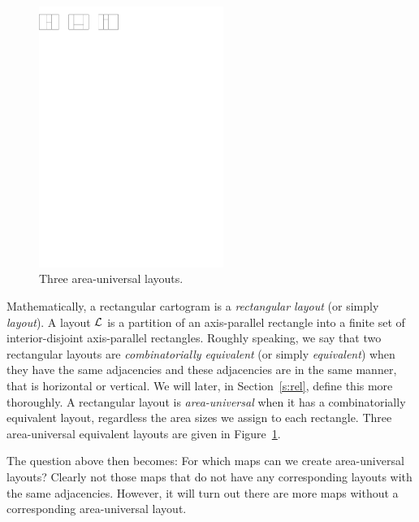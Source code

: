 \pagebreak[2]
  \begin{figure} %
    \centering
    \includegraphics[width = 6cm]{introduction/img/areaunivLayout.pdf}
    \caption{Three area-universal layouts.}
    \label{fig:intro:areaunivLayout}
  \end{figure}
  Mathematically, a rectangular cartogram is a  \emph{rectangular layout} (or simply \emph{layout}).
  A layout $\mathcal{L}$ is a partition of an axis-parallel rectangle into a finite set of interior-disjoint axis-parallel rectangles.
  Roughly speaking, we say that two rectangular layouts are \emph{combinatorially equivalent} (or simply \emph{equivalent}) when they have the same adjacencies and these adjacencies are in the same manner, that is horizontal or vertical. We will later, in Section~\ref{s:rel}, define this more thoroughly.
  A rectangular layout is \emph{area-universal} when it has a combinatorially equivalent layout, regardless the area sizes we assign to each rectangle.
  Three area-universal equivalent layouts are given in Figure~\ref{fig:intro:areaunivLayout}.

  The question above then becomes: For which maps can we create area-universal layouts?
  Clearly not those maps that do not have any corresponding layouts with the same adjacencies. However, it will turn out there are more maps without a corresponding area-universal layout.

